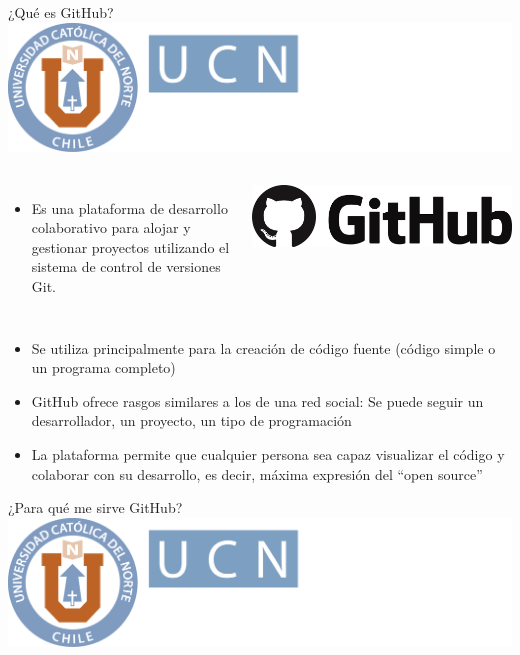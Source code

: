 \documentclass[12pt,a4paper,usenames,x11names,compress]{beamer}
\begin{document}
\begin{frame}{¿Qué es GitHub?\hfill \includegraphics[scale=.1]{eciem.png}}
\begin{columns}
 \begin{itemize}
 \justifying
\item Es una plataforma de desarrollo colaborativo para alojar y gestionar proyectos utilizando el sistema de control de versiones Git.
 \end{itemize}

\includegraphics[scale=.027]{github.png}  
\end{columns}
\begin{itemize}
\justifying
\item Se utiliza principalmente para la creación de código fuente (código simple o un programa completo)
\item GitHub ofrece rasgos similares a los de una red social: Se puede seguir un desarrollador, un proyecto, un tipo de programación 
\item La plataforma permite que  cualquier persona  sea capaz visualizar el código y colaborar con su desarrollo, es decir, máxima expresión del ``open source''
\end{itemize}
\end{frame}

\begin{frame}{¿Para qué me sirve GitHub?\hfill \includegraphics[scale=.1]{eciem.png}}

\end{frame}
\end{document}
